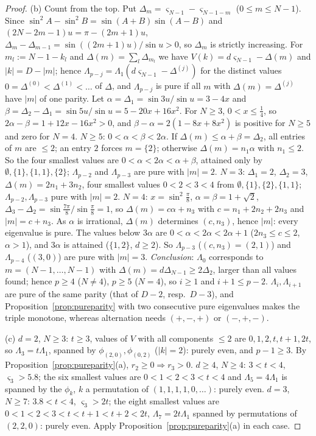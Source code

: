 \documentclass[10pt,a4paper]{article}
\theoremstyle{plain}
\theoremstyle{definition}
\begin{document}
\begin{proof}
(b) Count from the top. Put $\Delta_m=\varsigma_{N-1}-\varsigma_{N-1-m}$ ($0\le m\le N-1$). Since $\sin^2A-\sin^2B=\sin(A+B)\sin(A-B)$ and $(2N-2m-1)u=\pi-(2m+1)u$,
$\Delta_m-\Delta_{m-1}=\sin((2m+1)u)/\sin u>0$, so $\Delta_m$ is strictly increasing. For $m_l:=N-1-k_l$ and $\Delta(m)=\sum_l\Delta_{m_l}$ we have $V(k)=d\varsigma_{N-1}-\Delta(m)$ and $|k|=D-|m|$; hence $\Lambda_{p-j}=\Lambda_1(d\varsigma_{N-1}-\Delta^{(j)})$ for the distinct values $0=\Delta^{(0)}<\Delta^{(1)}<\dots$ of $\Delta$, and $\Lambda_{p-j}$ is pure if all $m$ with $\Delta(m)=\Delta^{(j)}$ have $|m|$ of one parity. Let $\alpha=\Delta_1=\sin3u/\sin u=3-4x$ and $\beta=\Delta_2-\Delta_1=\sin5u/\sin u=5-20x+16x^2$. For $N\ge3$, $0<x\le\frac14$, so $2\alpha-\beta=1+12x-16x^2>0$, and $\beta-\alpha=2(1-8x+8x^2)$ is positive for $N\ge5$ and zero for $N=4$.
\emph{$N\ge5$}: $0<\alpha<\beta<2\alpha$. If $\Delta(m)\le\alpha+\beta=\Delta_2$, all entries of $m$ are $\le2$; an entry $2$ forces $m=\{2\}$; otherwise $\Delta(m)=n_1\alpha$ with $n_1\le2$. So the four smallest values are $0<\alpha<2\alpha<\alpha+\beta$, attained only by $\emptyset,\{1\},\{1,1\},\{2\}$; $\Lambda_{p-2}$ and $\Lambda_{p-3}$ are pure with $|m|=2$.
\emph{$N=3$}: $\Delta_1=2$, $\Delta_2=3$, $\Delta(m)=2n_1+3n_2$, four smallest values $0<2<3<4$ from $\emptyset,\{1\},\{2\},\{1,1\}$; $\Lambda_{p-2},\Lambda_{p-3}$ pure with $|m|=2$.
\emph{$N=4$}: $x=\sin^2\frac\pi8$, $\alpha=\beta=1+\sqrt2$, $\Delta_3-\Delta_2=\sin\frac{7\pi}8/\sin\frac\pi8=1$, so $\Delta(m)=c\alpha+n_3$ with $c=n_1+2n_2+2n_3$ and $|m|=c+n_3$. As $\alpha$ is irrational, $\Delta(m)$ determines $(c,n_3)$, hence $|m|$: every eigenvalue is pure. The values below $3\alpha$ are $0<\alpha<2\alpha<2\alpha+1$ ($2n_3\le c\le2$, $\alpha>1$), and $3\alpha$ is attained ($\{1,2\}$, $d\ge2$). So $\Lambda_{p-3}$ ($(c,n_3)=(2,1)$) and $\Lambda_{p-4}$ ($(3,0)$) are pure with $|m|=3$.
\emph{Conclusion}: $\Lambda_0$ corresponds to $m=(N-1,\dots,N-1)$ with $\Delta(m)=d\Delta_{N-1}\ge2\Delta_2$, larger than all values found; hence $p\ge4$ ($N\ne4$), $p\ge5$ ($N=4$), so $i\ge1$ and $i+1\le p-2$. $\Lambda_i,\Lambda_{i+1}$ are pure of the same parity (that of $D-2$, resp.\ $D-3$), and Proposition~\ref{prop:pureparity} with two consecutive pure eigenvalues makes the triple monotone, whereas alternation needs $(+,-,+)$ or $(-,+,-)$.

(c) $d=2$, $N\ge3$: $t\ge3$, values of $V$ with all components $\le2$ are $0,1,2,t,t+1,2t$, so $\Lambda_3=t\Lambda_1$, spanned by $\phi_{(2,0)},\phi_{(0,2)}$ ($|k|=2$): purely even, and $p-1\ge3$. By Proposition~\ref{prop:pureparity}(a), $r_2\ge0\Rightarrow r_3>0$. $d\ge4$, $N\ge4$: $3<t<4$, $\varsigma_3>5.8$; the six smallest values are $0<1<2<3<t<4$ and $\Lambda_5=4\Lambda_1$ is spanned by the $\phi_k$, $k$ a permutation of $(1,1,1,1,0,\dots)$: purely even. $d=3$, $N\ge7$: $3.8<t<4$, $\varsigma_3>2t$; the eight smallest values are $0<1<2<3<t<t+1<t+2<2t$, $\Lambda_7=2t\Lambda_1$ spanned by permutations of $(2,2,0)$: purely even. Apply Proposition~\ref{prop:pureparity}(a) in each case.
\end{proof}
\end{document}
